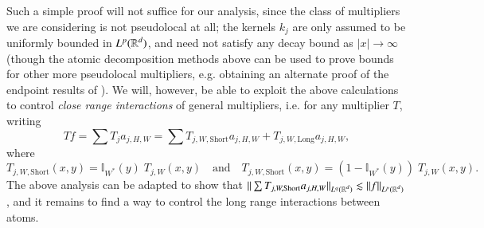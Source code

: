 Such a simple proof will not suffice for our analysis, since the class of multipliers we are considering is not pseudolocal at all; the kernels $k_j$ are only assumed to be uniformly bounded in $L^p(\operatorname{\mathbb{R}}^d)$, and need not satisfy any decay bound as $|x| \to \infty$ (though the atomic decomposition methods above can be used to prove bounds for other more pseudolocal multipliers, e.g. obtaining an alternate proof of the endpoint results of \cite{SeegerSingular}). We will, however, be able to exploit the above calculations to control \emph{close range interactions} of general multipliers, i.e. for any multiplier $T$, writing
%
\[ Tf = \sum T_j a_{j,H,W} = \sum T_{j,W,\text{Short}} a_{j,H,W} + T_{j,W,\text{Long}} a_{j,H,W}, \]
%
where
%
\[ T_{j,W,\text{Short}}(x,y) = \mathbb{I}_{W^*}(y)\; T_{j,W}(x,y) \quad\text{and}\quad T_{j,W,\text{Short}}(x,y) = (1 - \mathbb{I}_{W^*}(y))\; T_{j,W}(x,y). \]
%
The above analysis can be adapted to show that $\| \sum T_{j,W,\text{Short}} a_{j,H,W} \|_{L^q(\operatorname{\mathbb{R}}^d)} \lesssim \| f \|_{L^p(\operatorname{\mathbb{R}}^d)}$, and it remains to find a way to control the long range interactions between atoms.

